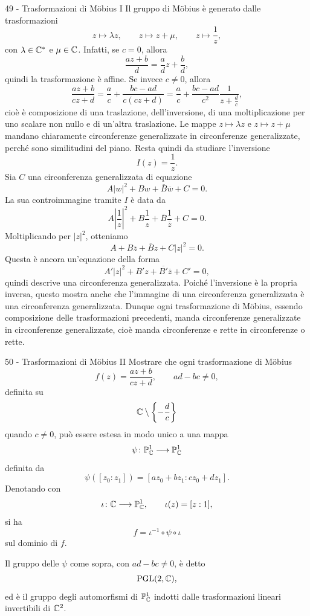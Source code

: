 \documentclass[a4paper]{article}
\begin{document}
\begin{snippetsolution}{49 - Trasformazioni di Möbius I}
    Il gruppo di Möbius è generato dalle trasformazioni
    \[
        z\mapsto \lambda z,
        \qquad
        z\mapsto z+\mu,
        \qquad
        z\mapsto \frac1z,
    \]
    con \(\lambda\in\mathbb{C}^*\) e \(\mu\in\mathbb{C}\). Infatti, se \(c=0\), allora
    \[
        \frac{az+b}{d}=\frac ad z+\frac bd,
    \]
    quindi la trasformazione è affine. Se invece \(c\neq0\), allora
    \[
        \frac{az+b}{cz+d}
        =
        \frac ac+\frac{bc-ad}{c(cz+d)}
        =
        \frac ac+\frac{bc-ad}{c^2}\frac1{z+\frac dc},
    \]
    cioè è composizione di una traslazione, dell'inversione, di una moltiplicazione per uno scalare non nullo e di un'altra traslazione.
    Le mappe \(z\mapsto \lambda z\) e \(z\mapsto z+\mu\) mandano chiaramente circonferenze generalizzate in circonferenze generalizzate, perché sono similitudini del piano. Resta quindi da studiare l'inversione
    \[
        I(z)=\frac1z.
    \]
    Sia \(C\) una circonferenza generalizzata di equazione
    \[
        A|w|^2+Bw+\overline{B}\overline w+C=0.
    \]
    La sua controimmagine tramite \(I\) è data da
    \[
        A\left|\frac1z\right|^2+B\frac1z+\overline{B}\frac1{\overline z}+C=0.
    \]
    Moltiplicando per \(|z|^2\), otteniamo
    \[
        A+B\overline z+\overline{B}z+C|z|^2=0.
    \]
    Questa è ancora un'equazione della forma
    \[
        A'|z|^2+B'z+\overline{B'}\overline z+C'=0,
    \]
    quindi descrive una circonferenza generalizzata. Poiché l'inversione è la propria inversa, questo mostra anche che l'immagine di una circonferenza generalizzata è una circonferenza generalizzata.
    Dunque ogni trasformazione di Möbius, essendo composizione delle trasformazioni precedenti, manda circonferenze generalizzate in circonferenze generalizzate, cioè manda circonferenze e rette in circonferenze o rette.
\end{snippetsolution}

\begin{snippetexercise}{50 - Trasformazioni di Möbius II}
    Mostrare che ogni trasformazione di Möbius
    \[
        f(z)=\frac{az+b}{cz+d},
        \qquad
        ad-bc\neq 0,
    \]
    definita su
    \[
        \mathbb{C}\setminus\left\{-\frac{d}{c}\right\}
    \]
    quando \(c\neq 0\), può essere estesa in modo unico a una mappa
    \[
        \psi\colon \mathbb{P}^1_{\mathbb{C}}\longrightarrow
        \mathbb{P}^1_{\mathbb{C}}
    \]
    definita da
    \[
        \psi([z_0:z_1])
        =
        [az_0+bz_1:cz_0+dz_1].
    \]
    Denotando con
    \[
        \iota\colon\mathbb{C}\longrightarrow
        \mathbb{P}^1_{\mathbb{C}},
        \qquad
        \iota(z)=[z:1],
    \]
    si ha
    \[
        f=\iota^{-1}\circ\psi\circ\iota
    \]
    sul dominio di \(f\).

    Il gruppo delle \(\psi\) come sopra, con \(ad-bc\neq 0\), è detto
    \[
        \operatorname{PGL}(2,\mathbb{C}),
    \]
    ed è il gruppo degli automorfismi di
    \(\mathbb{P}^1_{\mathbb{C}}\) indotti dalle trasformazioni
    lineari invertibili di \(\mathbb{C}^2\).
\end{snippetexercise}
\end{document}
